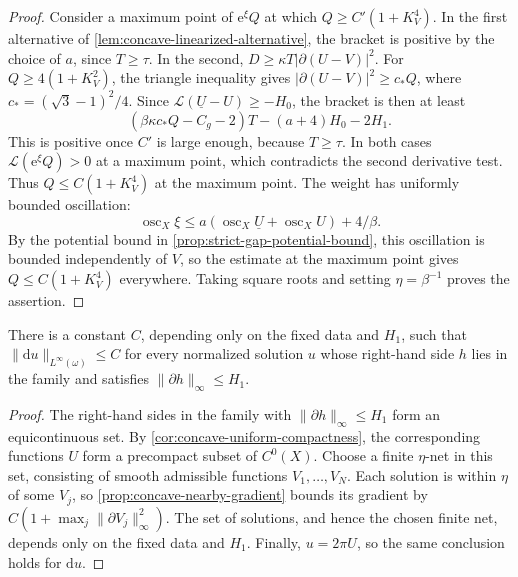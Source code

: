 \begin{proof}
Consider a maximum point of $\mathrm e^\xi Q$ at which $Q\geq C'(1+K_V^4)$. In the first alternative of \cref{lem:concave-linearized-alternative}, the bracket is positive by the choice of $a$, since $T\geq\tau$. In the second, $D\geq\kappa T|\partial(U-V)|^2$. For $Q\geq4(1+K_V^2)$, the triangle inequality gives $|\partial(U-V)|^2\geq c_*Q$, where $c_*=(\sqrt3-1)^2/4$. Since $\mathcal L(\underline U-U)\geq-H_0$, the bracket is then at least
\[
 (\beta\kappa c_*Q-C_g-2)T-(a+4)H_0-2H_1.
\]
This is positive once $C'$ is large enough, because $T\geq\tau$. In both cases $\mathcal L(\mathrm e^\xi Q)>0$ at a maximum point, which contradicts the second derivative test. Thus $Q\leq C(1+K_V^4)$ at the maximum point. The weight has uniformly bounded oscillation:
\[
 \operatorname{osc}_X\xi\leq a(\operatorname{osc}_X\underline U+\operatorname{osc}_XU)+4/\beta.
\]
By the potential bound in \cref{prop:strict-gap-potential-bound}, this oscillation is bounded independently of $V$, so the estimate at the maximum point gives $Q\leq C(1+K_V^4)$ everywhere. Taking square roots and setting $\eta=\beta^{-1}$ proves the assertion.
\end{proof}

\begin{theorem}\label{thm:concave-uniform-gradient}
There is a constant $C$, depending only on the fixed data and $H_1$, such that $\|\mathrm du\|_{L^\infty(\omega)}\leq C$ for every normalized solution $u$ whose right-hand side $h$ lies in the family and satisfies $\|\partial h\|_\infty\leq H_1$.
\end{theorem}
\begin{proof}
The right-hand sides in the family with $\|\partial h\|_\infty\leq H_1$ form an equicontinuous set. By \cref{cor:concave-uniform-compactness}, the corresponding functions $U$ form a precompact subset of $C^0(X)$. Choose a finite $\eta$-net in this set, consisting of smooth admissible functions $V_1,\ldots,V_N$. Each solution is within $\eta$ of some $V_j$, so \cref{prop:concave-nearby-gradient} bounds its gradient by $C(1+\max_j\|\partial V_j\|_\infty^2)$. The set of solutions, and hence the chosen finite net, depends only on the fixed data and $H_1$. Finally, $u=2\pi U$, so the same conclusion holds for $\mathrm du$.
\end{proof}
